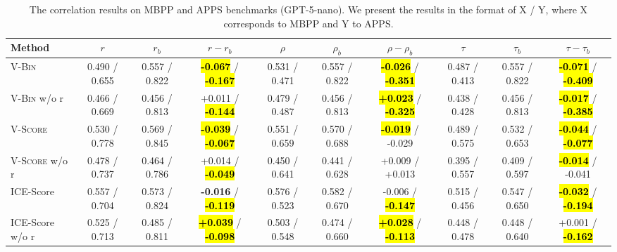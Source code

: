 \begin{table}[!t]
    \centering
    \scriptsize
    \setlength{\tabcolsep}{0.8pt}
    \caption{The correlation results on MBPP and APPS benchmarks (GPT-5-nano). We present the results in the format of X / Y, where X corresponds to MBPP and Y to APPS.}
    \label{tab:mbpp-apps}
    \begin{tabular}{@{}l|ccc|ccc|ccc@{}}
        \toprule
        Method & $r$ & $r_b$ & $r-r_b$ & $\rho$ & $\rho_b$ & $\rho-\rho_b$ & $\tau$ & $\tau_b$ & $\tau-\tau_b$ \\
        \midrule
        \textsc{V-Bin}               & 0.490 / 0.655    & 0.557 / 0.822    & \hl{\textbf{-0.067}} / \hl{\textbf{-0.167}}  & 0.531 / 0.471    & 0.557 / 0.822    & \hl{\textbf{-0.026}} / \hl{\textbf{-0.351}}  & 0.487 / 0.413    & 0.557 / 0.822    & \hl{\textbf{-0.071}} / \hl{\textbf{-0.409}}  \\
        \textsc{V-Bin} w/o r         & 0.466 / 0.669    & 0.456 / 0.813    & +0.011 / \hl{\textbf{-0.144}}                & 0.479 / 0.487    & 0.456 / 0.813    & \hl{\textbf{+0.023}} / \hl{\textbf{-0.325}}  & 0.438 / 0.428    & 0.456 / 0.813    & \hl{\textbf{-0.017}} / \hl{\textbf{-0.385}}  \\
        \textsc{V-Score}             & 0.530 / 0.778    & 0.569 / 0.845    & \hl{\textbf{-0.039}} / \hl{\textbf{-0.067}}  & 0.551 / 0.659    & 0.570 / 0.688    & \hl{\textbf{-0.019}} / -0.029                & 0.489 / 0.575    & 0.532 / 0.653    & \hl{\textbf{-0.044}} / \hl{\textbf{-0.077}}  \\
        \textsc{V-Score} w/o r       & 0.478 / 0.737    & 0.464 / 0.786    & +0.014 / \hl{\textbf{-0.049}}                & 0.450 / 0.641    & 0.441 / 0.628    & +0.009 / +0.013                              & 0.395 / 0.557    & 0.409 / 0.597    & \hl{\textbf{-0.014}} / -0.041                \\
        \midrule
        ICE-Score                    & 0.557 / 0.704    & 0.573 / 0.824    & \textbf{-0.016} / \hl{\textbf{-0.119}}       & 0.576 / 0.523    & 0.582 / 0.670    & -0.006 / \hl{\textbf{-0.147}}                & 0.515 / 0.456    & 0.547 / 0.650    & \hl{\textbf{-0.032}} / \hl{\textbf{-0.194}}  \\
        ICE-Score w/o r              & 0.525 / 0.713    & 0.485 / 0.811    & \hl{\textbf{+0.039}} / \hl{\textbf{-0.098}}  & 0.503 / 0.548    & 0.474 / 0.660    & \hl{\textbf{+0.028}} / \hl{\textbf{-0.113}}  & 0.448 / 0.478    & 0.448 / 0.640    & +0.001 / \hl{\textbf{-0.162}}                \\

\end{tabular}
\end{table}
